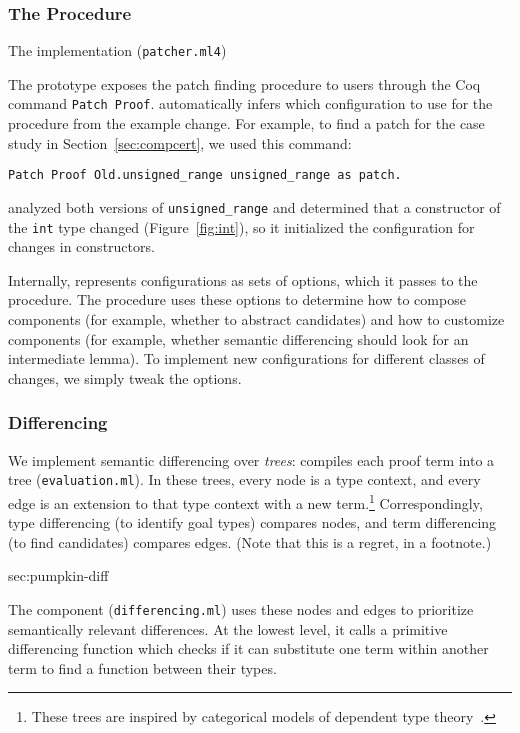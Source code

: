 \subsubsection{The Procedure}
\label{sec:pumpkin-impl-procedure}

The implementation (\lstinline{patcher.ml4})

The \sysname prototype exposes the patch finding procedure to users through the Coq command \lstinline{Patch Proof}. \sysname automatically
infers which configuration to use for the procedure from the example change. For example, to
find a patch for the case study in Section~\ref{sec:compcert}, we
used this command:

\begin{lstlisting}[language=ml4]
  Patch Proof Old.unsigned_range unsigned_range as patch.
\end{lstlisting}
\sysname analyzed both versions of \lstinline{unsigned_range} and determined 
that a constructor of the \lstinline{int} type changed (Figure~\ref{fig:int}),
so it initialized the configuration for changes in constructors.

Internally, \sysname represents configurations as sets of options,
which it passes to the procedure. The procedure uses these options to determine
how to compose components (for example, whether to abstract candidates) 
and how to customize components (for example, whether semantic differencing should look for an intermediate lemma).
To implement new configurations for different classes of changes, we simply tweak the options.

\subsubsection{Differencing} 
\label{sec:pumpkin-impl-diff}

We implement semantic differencing over \emph{trees}:
\sysname compiles each proof term into a tree (\lstinline{evaluation.ml}). In these trees,
every node is a type context, and every edge is an extension to that type context with a 
new term.\footnote{These trees are inspired by categorical models of dependent type theory~\cite{Hofmann97}.}
Correspondingly, type differencing (to identify goal types) compares nodes, 
and term differencing (to find candidates) compares edges. (Note that this is a regret, in a footnote.)

sec:pumpkin-diff

The component (\lstinline{differencing.ml}) uses these nodes and edges to prioritize semantically
relevant differences. At the lowest level, it calls a primitive differencing function 
which checks if it can substitute one term within another term to find a function between their types.

